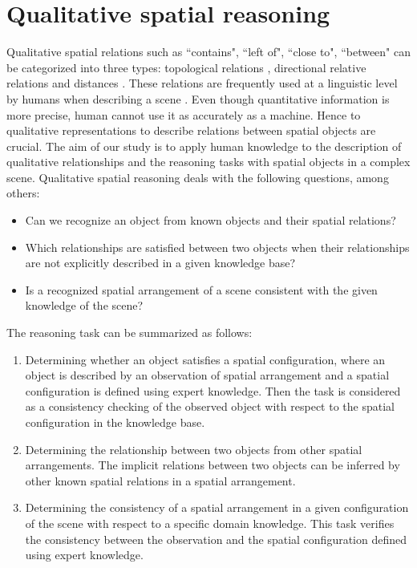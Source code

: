 \documentclass{article}
\begin{document}
\section{Qualitative spatial reasoning}\label{sec:qsr}
Qualitative spatial relations such as ``contains", ``left of", ``close to", ``between" can be categorized into three types: topological relations \cite{kuipers1978modeling}, 
directional relative relations and distances \cite{freeman1975modelling}. 
These relations are frequently used at a linguistic level by humans when describing a scene \cite{freksa1991qualitative}.
Even though quantitative information is more precise, human cannot use it as accurately as a machine.
Hence to qualitative representations to describe relations between spatial objects are crucial.
The aim of our study is to apply human knowledge to the description of qualitative relationships and the reasoning tasks with spatial objects in a complex scene.
Qualitative spatial reasoning deals with the following questions, among others:
 \begin{itemize}
  \item Can we recognize an object from known objects and their spatial relations?
  \item Which relationships are satisfied between two objects when their relationships are not explicitly described in a given  knowledge base?
  \item Is a recognized spatial arrangement of a scene consistent with the given knowledge of the scene?
 \end{itemize}
 
 The reasoning task can be summarized as follows:
 \begin{enumerate}
  \item Determining whether an object satisfies a spatial configuration, where an object is described by an observation of spatial arrangement and 
  a spatial configuration is defined using expert knowledge. Then the task is considered as a consistency checking  of the observed object with respect to the spatial configuration in 
  the knowledge base.
  \item Determining the relationship between two objects from other spatial arrangements. The implicit relations between two objects can be inferred by other known spatial relations
  in a spatial arrangement.
  \item Determining the consistency of a spatial arrangement in a given configuration of the scene with respect to a specific domain knowledge. This task verifies the consistency
  between the observation and the spatial configuration defined using expert knowledge.
 \end{enumerate}
\end{document}
